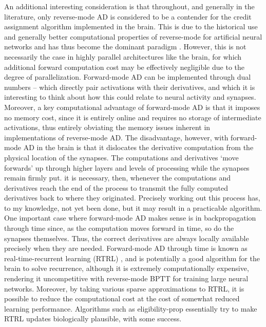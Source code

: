 An additional interesting consideration is that throughout, and generally in the literature, only reverse-mode AD is considered to be a contender for the credit assignment algorithm implemented in the brain. This is due to the historical use and generally better computational properties of reverse-mode for artificial neural networks \citep{griewank1989automatic,baydin2017automatic} and has thus become the dominant paradigm \citep{goodfellow2016deep,rumelhart1985feature,silver2017mastering}. However, this is not necessarily the case in highly parallel architectures like the brain, for which additional forward computation cost may be effectively negligible due to the degree of parallelization. Forward-mode AD can be implemented through dual numbers -- which directly pair activations with their derivatives, and which it is interesting to think about how this could relate to neural activity and synapses. Moreover, a key computational advantage of forward-mode AD is that it imposes no memory cost, since it is entirely online and requires no storage of intermediate activations, thus entirely obviating the memory issues inherent in implementations of reverse-mode AD. The disadvantage, however, with forward-mode AD in the brain is that it dislocates the derivative computation from the physical location of the synapses. The computations and derivatives `move forwards' up through higher layers and levels of processing while the synapses remain firmly put. it is necessary, then, whenever the computations and derivatives reach the end of the process to transmit the fully computed derivatives back to where they originated. Precisely working out this process has, to my knowledge, not yet been done, but it may result in a practicable algorithm. One important case where forward-mode AD makes sense is in backpropagation through time since, as the computation moves forward in time, so do the synapses themselves. Thus, the correct derivatives are always locally available precisely when they are needed. Forward-mode AD through time is known as real-time-recurrent learning (RTRL) \citep{williams1989experimental}, and is potentially a good algorithm for the brain to solve recurrence, although it is extremely computationally expensive, rendering it uncompetitive with reverse-mode BPTT for training large neural networks. Moreover, by taking various sparse approximations to RTRL, it is possible to reduce the computational cost at the cost of somewhat reduced learning performance. Algorithms such as eligibility-prop essentially try to make RTRL updates biologically plausible, with some success.


